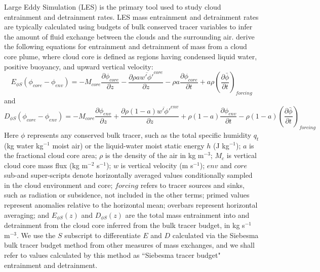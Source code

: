 \documentclass[12pt]{article}
\begin{document}
Large Eddy Simulation (LES) is the primary tool used to study cloud entrainment
and detrainment rates.  LES mass entrainment and detrainment rates are typically
calculated using budgets of bulk conserved tracer variables to infer the amount
of fluid exchange between the clouds and the surrounding air.  
\cite{Siebesma1995} derive the following equations for entrainment and
detrainment of mass from a cloud core plume, where cloud core is defined as
regions having condensed liquid water, positive buoyancy, and upward vertical
velocity:
\begin{equation}
  \label{eq:siebesma_entrainment}
    E_{\phi S}(\phi_{core} - \phi_{env}) = - M_{core} \frac{\partial \phi_{core}}{\partial z}
        - \frac{\partial \rho a \overline{w' \phi'}^{core}}{\partial z}
        - \rho a \frac{\partial \phi_{core}}{\partial t}
        + a \rho \left(\frac{\partial \bar{\phi}}{\partial t}\right)_{forcing}
\end{equation}
and
\begin{equation}
  \label{eq:siebesma_detrainment}
    D_{\phi S}(\phi_{core} - \phi_{env}) = - M_{core} \frac{\partial \phi_{env}}{\partial z}
        + \frac{\partial \rho (1 - a) \overline{w' \phi'}^{env}}{\partial z}
        + \rho (1-a) \frac{\partial \phi_{env}}{\partial t}
     - \rho (1-a) \left(\frac{\partial \bar{\phi}}{\partial t}\right)_{forcing}
\end{equation}
Here $\phi$ represents any conserved bulk tracer, such as the total specific 
humidity $q_t$ (kg water kg$^{-1}$ moist air) or the liquid-water moist static 
energy $h$ (J kg$^{-1}$); $a$ is the fractional cloud core area; $\rho$ is the
density of the air in kg m$^{-3}$; $M_c$ is vertical cloud core mass flux 
(kg m$^{-2}$ s$^{-1}$); $w$ is vertical velocity (m s$^{-1}$); $env$ and 
$core$ sub-and super-scripts denote horizontally averaged values conditionally
sampled in the cloud environment and core; $forcing$ refers to tracer sources 
and sinks, such as radiation or subsidence, not included in the other terms;
primed values represent anomalies relative to the horizontal mean; overbars
represent horizontal averaging; and $E_{\phi S}(z)$ and $D_{\phi S}(z)$ are the 
total mass entrainment into and detrainment from the cloud core inferred from 
the bulk tracer budget, in kg s$^{-1}$ m$^{-3}$.  We use the $S$ subscript
to differentiate $E$ and $D$ calculated via the Siebesma bulk tracer budget 
method from other measures of mass exchanges, and we shall refer to values calculated by this method as ``Siebesma tracer budget" entrainment and 
detrainment.
\end{document}
